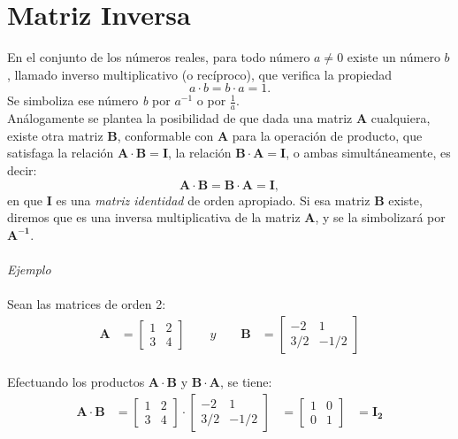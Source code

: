 \documentclass[a4paper,12pt]{report} %
\begin{document}
\section{Matriz Inversa}
En el conjunto de los números reales, para todo número \(\mathit{a}\neq 0\) existe un número \(\mathit{b}\), llamado inverso multiplicativo (o recíproco), que verifica la propiedad
\[
\mathit{a} \cdot \mathit{b} = \mathit{b} \cdot \mathit{a} = 1.
\]
Se simboliza ese número \textit{b} por \(\mathit{a^{-1}}\) o por \(\frac{1}{a}\).\\
Análogamente se plantea la posibilidad de que dada una matriz \textbf{A} cualquiera, existe otra matriz \textbf{B}, conformable con \textbf{A} para la operación de producto, que satisfaga la relación \(\mathbf{A \cdot B = I}\), la relación \(\mathbf{B \cdot A = I}\), o ambas simultáneamente, es decir:
\[
\mathbf{A \cdot B = B \cdot A = I},
\]
en que \textbf{I} es una \textit{matriz identidad} de orden apropiado. Si esa matriz \textbf{B} existe, diremos que es una inversa multiplicativa de la matriz \textbf{A}, y se la simbolizará por \(\mathbf{A^{-1}}\).
\\ \\
\textit{Ejemplo} \\ \\
Sean las matrices de orden 2:
\[
\begin{aligned}
\mathbf{A} &= \begin{bmatrix}
    1 & 2 \\
    3 & 4 
\end{bmatrix}
\qquad
y
\qquad
\mathbf{B} &= \begin{bmatrix}
    -2 & 1 \\
    3/2 & -1/2
\end{bmatrix}
\end{aligned}
\]\\ 
Efectuando los productos \(\mathbf{A\cdot B}\) y \(\mathbf{B\cdot A}\), se tiene:\\ 
\[
\begin{aligned}
\mathbf{A\cdot B} &= \begin{bmatrix}
    1 & 2 \\
    3 & 4 
\end{bmatrix}
\cdot
\begin{bmatrix}
    -2 & 1 \\
    3/2 & -1/2
\end{bmatrix}
&= \begin{bmatrix}
    1 & 0 \\
    0 & 1 
\end{bmatrix}
&= \mathbf{I_{2}}
\end{aligned}
\]\\
\end{document}
